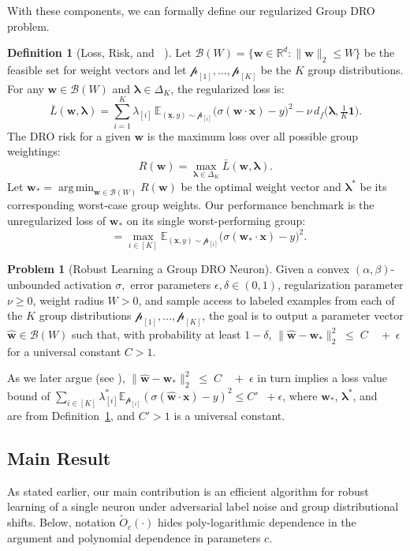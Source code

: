 \documentclass[11pt]{article}
\newcounter{thm}
\numberwithin{thm}{section}
\theoremstyle{plain}
\theoremstyle{definition}
\newtheorem{definition}[thm]{Definition}
\newtheorem{problem}[thm]{Problem}
\theoremstyle{remark} \newtheorem{remark}[thm]{Remark}
\def\vlambda{{\bm{\lambda}}}
\def\vw{{\bm{w}}}
\def\vx{{\bm{x}}}
\def\pp{{\mathcal{p}}}
\def\cB{{\mathcal{B}}}
\newcommand{\E}{\mathbb{E}}
\newcommand{\R}{\mathbb{R}}
\DeclareMathOperator*{\argmin}{arg\,min}
\DeclareMathOperator{\mOPT}{OPT_m}
\def\mathbf{\bm}
\begin{document}
With these components, we can formally define our regularized Group DRO problem.
\begin{definition}[Loss, Risk, and \(\mOPT\)]\label{def:loss-risk-opt}
Let \(\cB(W)=\{\vw \in \R^d :\|\vw\|_2\le W\}\) be the feasible set for weight vectors and let \(\pp_{[1]},\dots,\pp_{[K]}\) be the \(K\) group distributions. For any \(\vw\in\cB(W)\) and \(\vlambda\in\Delta_K\), the regularized loss is:
\[
\bar L(\vw,\vlambda)
=\sum_{i=1}^K\lambda_{[i]}\,\E_{(\vx,y)\sim\pp_{[i]}}\!\bigl(\sigma(\vw\cdot\vx)-y\bigr)^2
-\nu\,d_f\big(\vlambda,\tfrac1K\mathbf1\big).
\]
The DRO risk for a given \(\vw\) is the maximum loss over all possible group weightings:
\begin{equation}\label{eq:population-risk}
    R(\vw)=\max_{\vlambda\in\Delta_K}\bar L(\vw,\vlambda).
\end{equation}
Let \(\vw_*=\argmin_{\vw\in\cB(W)}R(\vw)\) be the optimal weight vector and \(\vlambda^*\) be its corresponding worst-case group weights. Our performance benchmark is the unregularized loss of \(\vw_*\) on its single worst-performing group:
\[
\mOPT =\max_{i\in[K]}\E_{(\vx,y)\sim\pp_{[i]}}\!\bigl(\sigma(\vw_*\!\cdot\!\vx)-y\bigr)^2.
\]
\end{definition}

\begin{problem}[Robust Learning a Group DRO Neuron]\label{prob:group-dro}
Given a convex $(\alpha, \beta)$-unbounded activation $\sigma,$ error parameters \(\epsilon,\delta\in(0,1)\), regularization parameter \(\nu \ge 0\), weight radius \(W>0\), and sample access to labeled examples from each of the \(K\) group distributions \(\pp_{[1]},\dots,\pp_{[K]}\), the goal is to output a parameter vector \(\widehat{\vw}\in\cB(W)\) such that, with probability at least \(1-\delta\),
\(
\|\widehat{\vw}-\vw_*\|_2^2 \;\le\; C\,\mOPT \;+\;\epsilon
\)
for a universal constant $C > 1.$ 
\end{problem}
As we later argue (see ), \(
\|\widehat{\vw}-\vw_*\|_2^2 \;\le\; C\,\mOPT \;+\;\epsilon
\) in turn implies a loss value bound of \(\sum_{i \in [K]} \lambda^*_{[i]} \E_{\pp_{[i]}}(\sigma(\widehat{\mathbf w}\cdot\mathbf x)-y)^2 \le C' \mOPT+ \epsilon\), where \(\vw_*\), \(\vlambda^*\), and \(\mOPT\) are from Definition~\ref{def:loss-risk-opt}, and \(C'> 1\) is a universal constant.

\subsection{Main Result}\label{subsec:main_result}
As stated earlier, our main contribution is an efficient algorithm for robust learning of a single neuron under adversarial label noise and group distributional shifts. Below, notation $\tilde{O}_c(\cdot)$ hides poly-logarithmic dependence in the argument and polynomial dependence in parameters $c$.  
\end{document}
